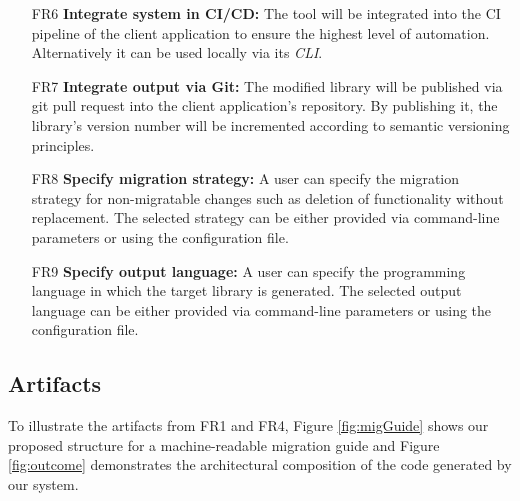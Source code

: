 \begin{itemize}[itemindent=-4pt, leftmargin=34pt, align=left]
     \item [FR6\hphantom{1}] 
     \textbf{Integrate system in CI/CD:} The tool will be integrated into the CI pipeline of the client application to ensure the highest level of automation. Alternatively it can be used locally via its \textit{\ac{CLI}}.
     \item [FR7\hphantom{1}] 
     \textbf{Integrate output via Git:} The modified library will be published via git pull request into the client application's repository. By publishing it, the library's version number will be incremented according to semantic versioning principles.
     \item [FR8\hphantom{1}] 
     \textbf{Specify migration strategy:} A user can specify the migration strategy for non-migratable changes such as deletion of functionality without replacement. The selected strategy can be either provided via command-line parameters or using the configuration file. 
          \item [FR9\hphantom{1}] 
     \textbf{Specify output language:} A user can specify the programming language in which the target library is generated. The selected output language can be either provided via command-line parameters or using the configuration file. 
\end{itemize}

\subsection{Artifacts}
\label{subsec:Artifacts}

To illustrate the artifacts from FR1 and FR4, Figure \ref{fig:migGuide} shows our proposed structure for a machine-readable migration guide and Figure \ref{fig:outcome} demonstrates the architectural composition of the code generated by our system.

\begin{figure}[h]
\end{figure}


